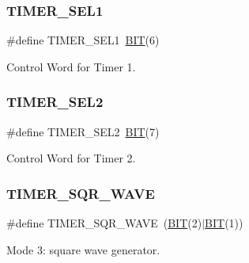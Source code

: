 \subsubsection{\texorpdfstring{T\+I\+M\+E\+R\+\_\+\+S\+E\+L1}{TIMER\_SEL1}}
{\footnotesize\ttfamily \#define T\+I\+M\+E\+R\+\_\+\+S\+E\+L1~\hyperlink{video__gr_8c_a3a8ea58898cb58fc96013383d39f482c}{B\+IT}(6)}



Control Word for Timer 1. 

\hypertarget{group__i8254_ga142a255de0dbc48aeabd45fc10c33672}{}\label{group__i8254_ga142a255de0dbc48aeabd45fc10c33672} 
\subsubsection{\texorpdfstring{T\+I\+M\+E\+R\+\_\+\+S\+E\+L2}{TIMER\_SEL2}}
{\footnotesize\ttfamily \#define T\+I\+M\+E\+R\+\_\+\+S\+E\+L2~\hyperlink{video__gr_8c_a3a8ea58898cb58fc96013383d39f482c}{B\+IT}(7)}



Control Word for Timer 2. 

\hypertarget{group__i8254_ga4745cbf21da3d3fea5dbb080b2b73bac}{}\label{group__i8254_ga4745cbf21da3d3fea5dbb080b2b73bac} 
\subsubsection{\texorpdfstring{T\+I\+M\+E\+R\+\_\+\+S\+Q\+R\+\_\+\+W\+A\+VE}{TIMER\_SQR\_WAVE}}
{\footnotesize\ttfamily \#define T\+I\+M\+E\+R\+\_\+\+S\+Q\+R\+\_\+\+W\+A\+VE~(\hyperlink{video__gr_8c_a3a8ea58898cb58fc96013383d39f482c}{B\+IT}(2)$\vert$\hyperlink{video__gr_8c_a3a8ea58898cb58fc96013383d39f482c}{B\+IT}(1))}



Mode 3\+: square wave generator. 

